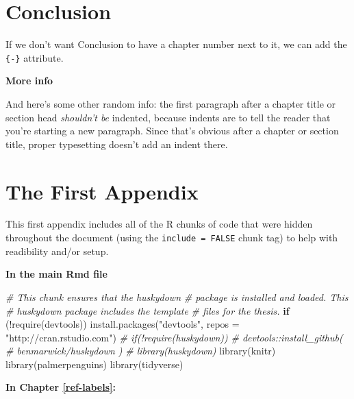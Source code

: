 \documentclass[print]{nuthesis}
\newenvironment{Shaded}{\begin{snugshade}}{\end{snugshade}}
\newcommand{\AttributeTok}[1]{\textcolor[rgb]{0.77,0.63,0.00}{#1}}
\newcommand{\CommentTok}[1]{\textcolor[rgb]{0.56,0.35,0.01}{\textit{#1}}}
\newcommand{\ControlFlowTok}[1]{\textcolor[rgb]{0.13,0.29,0.53}{\textbf{#1}}}
\newcommand{\FunctionTok}[1]{\textcolor[rgb]{0.00,0.00,0.00}{#1}}
\newcommand{\NormalTok}[1]{#1}
\newcommand{\SpecialCharTok}[1]{\textcolor[rgb]{0.00,0.00,0.00}{#1}}
\newcommand{\StringTok}[1]{\textcolor[rgb]{0.31,0.60,0.02}{#1}}
\begin{document}
\hypertarget{conclusion-1}{%
\chapter*{Conclusion}\label{conclusion-1}}

If we don't want Conclusion to have a chapter number next to it, we can add the \texttt{\{-\}} attribute.

\textbf{More info}

And here's some other random info: the first paragraph after a chapter title or section head \emph{shouldn't be} indented, because indents are to tell the reader that you're starting a new paragraph. Since that's obvious after a chapter or section title, proper typesetting doesn't add an indent there.

\appendix

\hypertarget{the-first-appendix}{%
\chapter{The First Appendix}\label{the-first-appendix}}

This first appendix includes all of the R chunks of code that were hidden throughout the document (using the \texttt{include\ =\ FALSE} chunk tag) to help with readibility and/or setup.

\textbf{In the main Rmd file}

\begin{Shaded}
\begin{Highlighting}[]
\CommentTok{\# This chunk ensures that the huskydown}
\CommentTok{\# package is installed and loaded. This}
\CommentTok{\# huskydown package includes the template}
\CommentTok{\# files for the thesis.}
\ControlFlowTok{if}\NormalTok{ (}\SpecialCharTok{!}\FunctionTok{require}\NormalTok{(devtools)) }\FunctionTok{install.packages}\NormalTok{(}\StringTok{"devtools"}\NormalTok{,}
    \AttributeTok{repos =} \StringTok{"http://cran.rstudio.com"}\NormalTok{)}
\CommentTok{\# if(!require(huskydown))}
\CommentTok{\# devtools::install\_github(}
\CommentTok{\# \textquotesingle{}benmarwick/huskydown\textquotesingle{} )}
\CommentTok{\# library(huskydown)}
\FunctionTok{library}\NormalTok{(knitr)}
\FunctionTok{library}\NormalTok{(palmerpenguins)}
\FunctionTok{library}\NormalTok{(tidyverse)}
\end{Highlighting}
\end{Shaded}

\textbf{In Chapter \ref{ref-labels}:}
\end{document}
